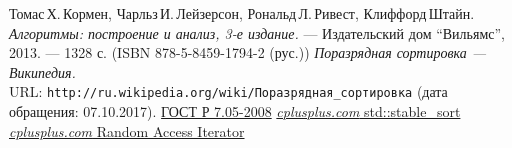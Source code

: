 \begin{thebibliography}{99}
Томас\,Х.\,Кормен, Чарльз\,И.\,Лейзерсон, Рональд\,Л.\,Ривест, Клиффорд\,Штайн.
{\itshape Алгоритмы: построение и анализ, 3-е издание.} --- Издательский дом \enquote{Вильямс}, 2013. --- 1328 с. (ISBN 878-5-8459-1794-2 (рус.))
{\itshape Поразрядная сортировка — Википедия.} \\URL: \texttt{http://ru.wikipedia.org/wiki/Поразрядная\_сортировка} (дата обращения: 07.10.2017). 
\href{http://www.ifap.ru/library/gost/7052008.pdf}{ГОСТ Р 7.05-2008}
\href{http://www.cplusplus.com/reference/algorithm/stable_sort/}{{\itshape cplusplus.com} std::stable\_sort}
\href{http://www.cplusplus.com/reference/iterator/RandomAccessIterator/}{{\itshape cplusplus.com} Random Access Iterator}
\end{thebibliography}
\pagebreak

